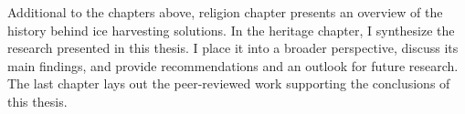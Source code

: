 Additional to the chapters above, religion chapter presents an overview of the history behind ice harvesting
solutions. In the heritage chapter, I synthesize the research presented in this thesis. I place it into a
broader perspective, discuss its main findings, and provide recommendations and an outlook for future research.
The last chapter lays out the peer-reviewed work supporting the conclusions of this thesis.

%
%


